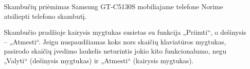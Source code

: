 \begin{xcase}{Skambučių priėmimas Samsung GT-C5130S mobiliajame telefone}
  \xcgoal
  {
    Norime atsiliepti telefono skambutį.
  }
  
  \xctools
  { %
  }
  
  \xcresult
  {
    Skambučio pradžioje kairysis mygtukas susietas su funkcija „Priimti“, o
    dešinysis – „Atmesti“. Jeigu nuspaudžiamas koks nors skaičių klaviatūros
    mygtukas, pasirodo skaičių įvedimo laukelis neturintis jokio kito
    funkcionalumo, negu „Valyti“ (dešinysis mygtukas) ir „Atmesti“ (kairysis
    mygtukas).
  }
  
  \xcprinciples
  {
    {
    }
  }
  
  \xcthoughts
  {
  }
\end{xcase}

